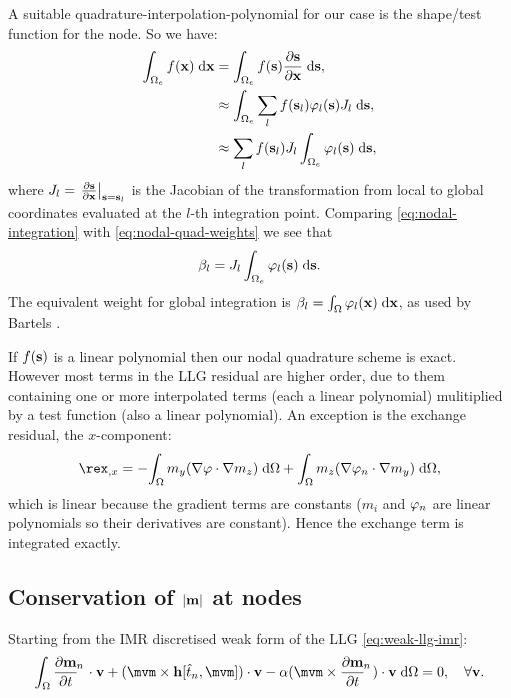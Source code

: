 A suitable quadrature-interpolation-polynomial for our case is the shape/test function for the node.
So we have:
\begin{equation}
\label{eq:nodal-quad-weights}
  \begin{aligned}
    \int_{\Omega_e} f(\mathbf{x}) {\; \text{d}} \mathbf{x} &= \int_{\Omega_e} f({\mathbf{s}}) \frac{\partial {\mathbf{s}}}{\partial \mathbf{x}} {\; \text{d}} {\mathbf{s}}, \\
    &\approx \int_{\Omega_e} \sum_l f({\mathbf{s}}_l) \varphi_l({\mathbf{s}}) J_l {\; \text{d}} {\mathbf{s}}, \\
    &\approx  \sum_l f({\mathbf{s}}_l) J_l \int_{\Omega_e} \varphi_l({\mathbf{s}})  {\; \text{d}} {\mathbf{s}},
  \end{aligned} 
\end{equation}
where $J_l =  {\left. {\frac{\partial {\mathbf{s}}}{\partial \mathbf{x}}} \right|_{{\mathbf{s}}={\mathbf{s}}_l}}$ is the Jacobian of the transformation from local to global coordinates evaluated at the $l$-th integration point.
Comparing \eqref{eq:nodal-integration} with \eqref{eq:nodal-quad-weights} we see that
\begin{equation}
  \beta_l =  J_l \int_{\Omega_e} \varphi_l({\mathbf{s}})  {\; \text{d}} {\mathbf{s}}.
\end{equation}
The equivalent weight for global integration is $\beta_l = \int_{\Omega} \varphi_l(\mathbf{x}) {\; \text{d}} \mathbf{x}$, as used by Bartels \etal\cite{Bartels2006}.

If $f({\mathbf{s}})$ is a linear polynomial then our nodal quadrature scheme is exact.
However most terms in the LLG residual are higher order, due to them containing one or more interpolated terms (each a linear polynomial) mulitiplied by a test function (also a linear polynomial).
An exception is the exchange residual, \eg the $x$-component:
\begin{equation}
  \begin{aligned}
    \rex_{,x} = - \intd{ m_y \bigb{\grad \tbf \cdot \grad m_z}} + \intd{ m_z \bigb{\grad \tbf_n \cdot \grad m_y}},
  \end{aligned}
\end{equation}
which is linear because the gradient terms are constants ($m_i$ and $\varphi_n$ are linear polynomials so their derivatives are constant).
Hence the exchange term is integrated exactly.



\subsection{Conservation of $\left|{\mathbf{m}} \right|$ at nodes}
\label{sec:weak-cons-absmv}

Starting from the IMR discretised weak form of the LLG \eqref{eq:weak-llg-imr}:
\begin{equation}
  \intd{\dmdtm \cdot \testv + (\mvm \times \hv[\tm, \mvm]) \cdot \testv - \dampc (\mvm \times \dmdtm) \cdot \testv }= 0, \quad \forall \testv .
\end{equation}

